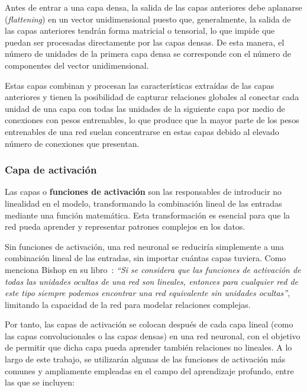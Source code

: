 Antes de entrar a una capa densa, la salida de las capas anteriores debe aplanarse (\emph{flattening}) en un vector unidimensional puesto que, generalmente, la salida de las capas anteriores tendrán forma matricial o tensorial, lo que impide que puedan ser procesadas directamente por las capas densas. De esta manera, el número de unidades de la primera capa densa se corresponde con el número de componentes del vector unidimensional.

Estas capas combinan y procesan las características extraídas de las capas anteriores y tienen la posibilidad de capturar relaciones globales al conectar cada unidad de una capa con todas las unidades de la siguiente capa por medio de conexiones con pesos entrenables, lo que produce que la mayor parte de los pesos entrenables de una red suelan concentrarse en estas capas debido al elevado número de conexiones que presentan.

\subsubsection{Capa de activación}\label{subsubsec:capa-de-activacion}

Las capas o \textbf{funciones de activación} son las responsables de introducir no linealidad en el modelo, transformando la combinación lineal de las entradas mediante una función matemática. Esta transformación es esencial para que la red pueda aprender y representar patrones complejos en los datos. 

Sin funciones de activación, una red neuronal se reduciría simplemente a una combinación lineal de las entradas, sin importar cuántas capas tuviera. Como menciona Bishop en su libro~\cite{Bishop2006}: \textit{``Si se considera que las funciones de activación de todas las unidades ocultas de una red son lineales, entonces para cualquier red de este tipo siempre podemos encontrar una red equivalente sin unidades ocultas''}, limitando la capacidad de la red para modelar relaciones complejas.

Por tanto, las capas de activación se colocan después de cada capa lineal (como las capas convolucionales o las capas densas) en una red neuronal, con el objetivo de permitir que dicha capa pueda aprender también relaciones no lineales. A lo largo de este trabajo, se utilizarán algunas de las funciones de activación más comunes y ampliamente empleadas en el campo del aprendizaje profundo, entre las que se incluyen:

